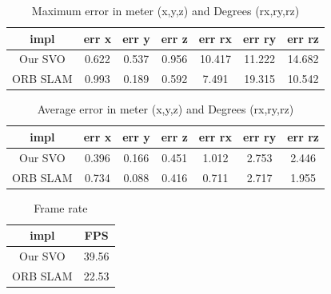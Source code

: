 \documentclass[11pt,a4paper,titlepage,oneside]{report}
\begin{document}
\begin{table}[H]
  \centering
  \begin{tabular}{|c|c|c|c|c|c|c|}
  impl & err x & err y & err z & err rx & err ry & err rz\\
  \hline
  Our SVO & 0.622 & 0.537 & 0.956 & 10.417 & 11.222 & 14.682\\
  ORB SLAM& 0.993 & 0.189 & 0.592 & 7.491 & 19.315 & 10.542
\end{tabular}
\caption{Maximum error in meter (x,y,z) and Degrees (rx,ry,rz)}
\label{tab:barcelona_maximas}
\end{table}

\begin{table}[H]
  \centering
  \begin{tabular}{|c|c|c|c|c|c|c|}
    impl & err x & err y & err z & err rx & err ry & err rz\\
    \hline
    Our SVO & 0.396 & 0.166 & 0.451 & 1.012 & 2.753 & 2.446\\
    ORB SLAM & 0.734 & 0.088 & 0.416 & 0.711 & 2.717 & 1.955
  \end{tabular}
\caption{Average error in meter (x,y,z) and Degrees (rx,ry,rz)}
\label{tab:barcelona_average}
\end{table}

\begin{table}[H]
  \centering
  \begin{tabular}{|c|c|}
  impl & FPS\\
  \hline
  Our SVO & 39.56\\
  ORB SLAM & 22.53
\end{tabular}
\caption{Frame rate}
\label{tab:barcelona_fps}
\end{table}
\end{document}
